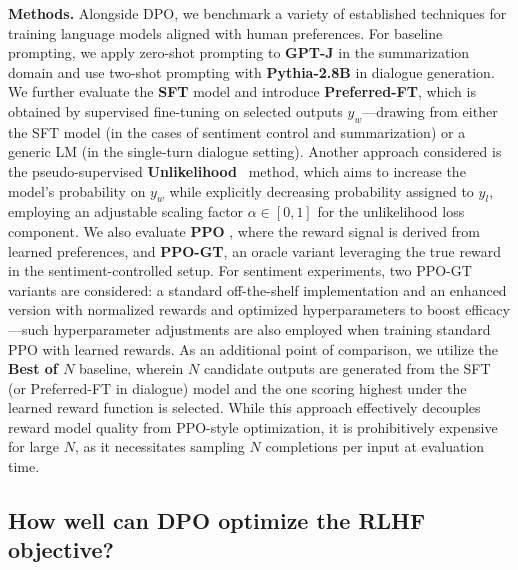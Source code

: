 \textbf{Methods.} Alongside DPO, we benchmark a variety of established techniques for training language models aligned with human preferences. For baseline prompting, we apply zero-shot prompting to \textbf{GPT-J} \citep{gpt-j} in the summarization domain and use two-shot prompting with \textbf{Pythia-2.8B} \citep{biderman2023pythia} in dialogue generation. We further evaluate the \textbf{SFT} model and introduce \textbf{Preferred-FT}, which is obtained by supervised fine-tuning on selected outputs $y_w$—drawing from either the SFT model (in the cases of sentiment control and summarization) or a generic LM (in the single-turn dialogue setting). Another approach considered is the pseudo-supervised \textbf{Unlikelihood}~\citep{welleck2019neural} method, which aims to increase the model’s probability on $y_w$ while explicitly decreasing probability assigned to $y_l$, employing an adjustable scaling factor $\alpha\in[0,1]$ for the unlikelihood loss component. We also evaluate \textbf{PPO} \citep{schulman2017proximal}, where the reward signal is derived from learned preferences, and \textbf{PPO-GT}, an oracle variant leveraging the true reward in the sentiment-controlled setup. For sentiment experiments, two PPO-GT variants are considered: a standard off-the-shelf implementation \cite{leandro_von_werra_2023_7790115} and an enhanced version with normalized rewards and optimized hyperparameters to boost efficacy—such hyperparameter adjustments are also employed when training standard PPO with learned rewards. As an additional point of comparison, we utilize the \textbf{Best of $N$} baseline, wherein $N$ candidate outputs are generated from the SFT (or Preferred-FT in dialogue) model and the one scoring highest under the learned reward function is selected. While this approach effectively decouples reward model quality from PPO-style optimization, it is prohibitively expensive for large $N$, as it necessitates sampling $N$ completions per input at evaluation time.

\subsection{How well can DPO optimize the RLHF objective?}


